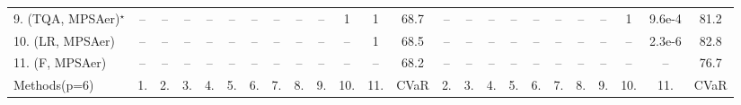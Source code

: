 \begin{table}[ht]
{\begin{tabular}{l|cccccccccccc|ccccccccccc|}
9. (TQA, MPSAer)$^\star$ & -- & -- & -- & -- & -- & -- & -- & -- & -- & 1 & 1 & 68.7 & -- & -- & -- & -- & -- & -- & -- & -- & 1 & {\cellcolor[HTML]{00441B}} \color[HTML]{F1F1F1} 9.6e-4 & 81.2 \\
10. (LR, MPSAer) & -- & -- & -- & -- & -- & -- & -- & -- & -- & -- & 1 & 68.5 & -- & -- & -- & -- & -- & -- & -- & -- & -- & {\cellcolor[HTML]{00441B}} \color[HTML]{F1F1F1} 2.3e-6 & 82.8 \\
11. (F, MPSAer) & -- & -- & -- & -- & -- & -- & -- & -- & -- & -- & -- & 68.2 & -- & -- & -- & -- & -- & -- & -- & -- & -- & -- & 76.7 \\
\hline

Methods(p=6) & 1. & 2. & 3. & 4. & 5. & 6. & 7. & 8. & 9. & 10. & 11. & CVaR & 2. & 3. & 4. & 5. & 6. & 7. & 8. & 9. & 10. & 11. & CVaR \\
\hline


\end{tabular}}
\end{table}
